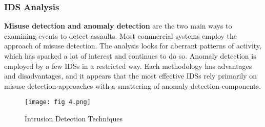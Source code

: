 \documentclass[12pt]{article}
\begin{document}
    \subsubsection{IDS Analysis}
    \par \textbf{Misuse detection and anomaly detection} are the two main ways to examining events to detect assaults. Most commercial systems employ the approach of misuse detection. The analysis looks for aberrant patterns of activity, which has sparked a lot of interest and continues to do so. Anomaly detection is employed by a few IDSs in a restricted way. Each methodology has advantages and disadvantages, and it appears that the most effective IDSs rely primarily on misuse detection approaches with a smattering of anomaly detection components.
    
    \begin{figure}[h]
        \centering
        \texttt{[image: fig 4.png]}
        \caption{Intrusion Detection Techniques}
    \end{figure}
\end{document}
